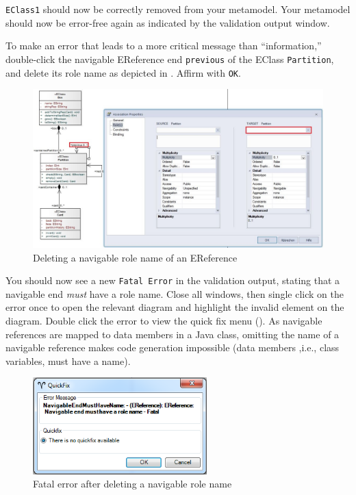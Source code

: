 \begin{stepbystep}
\vspace{0.5cm}

\item \texttt{EClass1} should now be correctly removed from your metamodel. Your metamodel should now be error-free again as indicated by
the validation output window.

\item To make an error that leads to a more critical message than ``information,'' double-click the navigable EReference end
\texttt{previous} of the EClass \texttt{Partition}, and delete its role name as depicted in . Affirm with \texttt{OK}.

\begin{figure}[htbp]
    \centering
  \includegraphics[width=1.0\textwidth]{../../org.moflon.doc.handbook.02_leitnersLearningBox/2_staticSemantics/5_validation/images/ea_validationDeleteRoleName}
    \caption{Deleting a navigable role name of an EReference}
    \label{ea:delete-role-name}
\end{figure}

\item You should now see a new \texttt{Fatal Error} in the validation output, stating that a navigable end \emph{must} have a role name.
Close all windows, then single click on the error once to open the relevant diagram and highlight the invalid element on the diagram. Double click the error to
view the quick fix menu (). As navigable references are mapped to data members in a Java class, omitting the name of a navigable
reference makes code generation impossible (data members ,i.e., class variables, must have a name).

\begin{figure}[htbp]
	\centering
  \includegraphics[width=0.6\textwidth]{../../org.moflon.doc.handbook.02_leitnersLearningBox/2_staticSemantics/5_validation/images/ea_quickFixFatal}
	\caption{Fatal error after deleting a navigable role name}
	\label{ea:fatal-error}
\end{figure}


\end{stepbystep}
